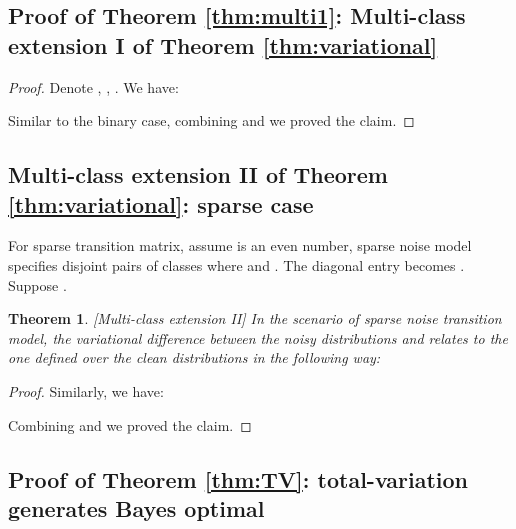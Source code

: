 \documentclass{article}
\newtheorem{theorem}{Theorem}
\begin{document}
\subsection{Proof of Theorem \ref{thm:multi1}: Multi-class extension I of Theorem \ref{thm:variational}}
\begin{proof}
Denote , , . 
We have:



Similar to the binary case, combining  and  we proved the claim.
\end{proof}


\subsection{Multi-class extension II of Theorem \ref{thm:variational}: sparse case}
For sparse transition matrix, assume  is an even number, sparse noise model specifies  disjoint pairs of classes  where  and . The diagonal entry  becomes . Suppose .
\begin{theorem}\label{thm:multi2}
[Multi-class extension II] In the scenario of sparse noise transition model, the variational difference between the noisy distributions  and  relates to the one defined over the clean distributions in the following way:

\end{theorem}
\begin{proof}

Similarly, we have:

Combining  and  we proved the claim.
\end{proof}



\subsection{Proof of Theorem \ref{thm:TV}: total-variation generates Bayes optimal}
\end{document}
